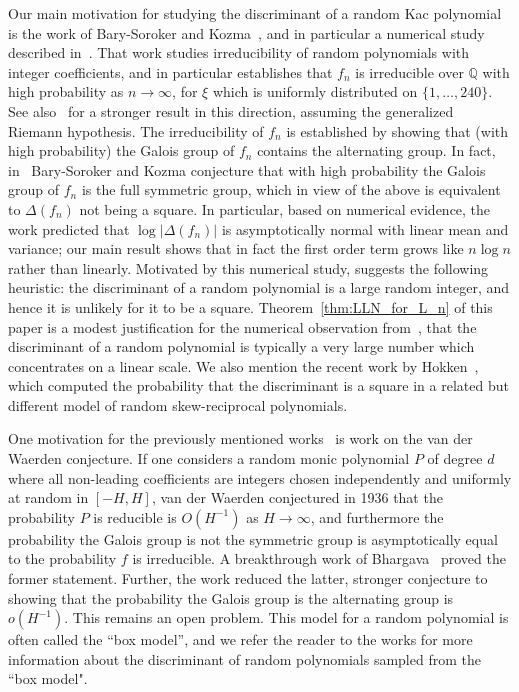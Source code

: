 \documentclass[11pt]{amsart}
\theoremstyle{remark}
\theoremstyle{definition}
\newcommand{\bQ}{\mathbb Q}
\newcommand{\disc}{\Delta}
\begin{document}
        Our main motivation for studying the discriminant of a random Kac polynomial is the work of Bary-Soroker and Kozma~\cite{BarySoroker-Kozma}, and in particular a numerical study described in~\cite[Section~4]{BarySoroker-Kozma}. That work studies irreducibility of random polynomials with integer coefficients, and in particular establishes that $f_n$ is irreducible over $\bQ$ with high probability as $n\to\infty$, for $\xi$ which is uniformly distributed on $\{1,\ldots,240 \}$. See also~\cite{Breuillard-Varju} for a stronger result in this direction, assuming the generalized Riemann hypothesis. The irreducibility of $f_n$ is established by showing that (with high probability) the Galois group of $f_n$ contains the alternating group. In fact, in~\cite[Section~4]{BarySoroker-Kozma} Bary-Soroker and Kozma conjecture  that with high probability the Galois group of $f_n$ is the full symmetric group, which in view of the above is equivalent to $\disc(f_n)$ not being a square. In particular, based on numerical evidence, the work \cite{BarySoroker-Kozma} predicted that $\log|\Delta(f_n)|$ is asymptotically normal with linear mean and variance; our main result shows that in fact the first order term grows like
        $n \log n$ rather than 
        linearly. Motivated by this numerical study, \cite{BarySoroker-Kozma} suggests the following heuristic: the discriminant of a random polynomial is a large random integer, and hence it is unlikely for it to be a square. Theorem~\ref{thm:LLN_for_L_n} of this paper is a modest justification for the numerical observation from~\cite[Section~4]{BarySoroker-Kozma}, that the discriminant of a random polynomial is typically a very large number which concentrates on a linear scale. We also mention the recent work by Hokken~\cite{Hokken}, which computed the probability that the discriminant is a square in a related but different model of random skew-reciprocal polynomials. 

       One motivation for the previously mentioned works~\cite{BarySoroker-Kozma,Breuillard-Varju} is work on the van der Waerden conjecture.  If one considers a random monic polynomial $P$ of degree $d$ where all non-leading coefficients are integers chosen independently and uniformly at random in $[-H,H]$, van der Waerden conjectured in 1936 that the probability $P$ is reducible is $O(H^{-1})$ as $H\to\infty$, and furthermore the probability the Galois group is not the symmetric group is asymptotically equal to the probability $f$ is irreducible.  A breakthrough work of Bhargava~\cite{bhargava2025galois} proved the former statement.  Further, the work reduced the latter, stronger conjecture to showing that the probability the Galois group is the alternating group is $o(H^{-1})$.  This remains an open problem. This model for a random polynomial is often called the ``box model'', and we refer the reader to the works \cite{Bary-Soroker-BenPorath-Matei,Bary-Soroker-Goldgraber,Gotze-Zaporozhets} for more information about the discriminant of random polynomials sampled from the ``box model". 
    
\end{document}

